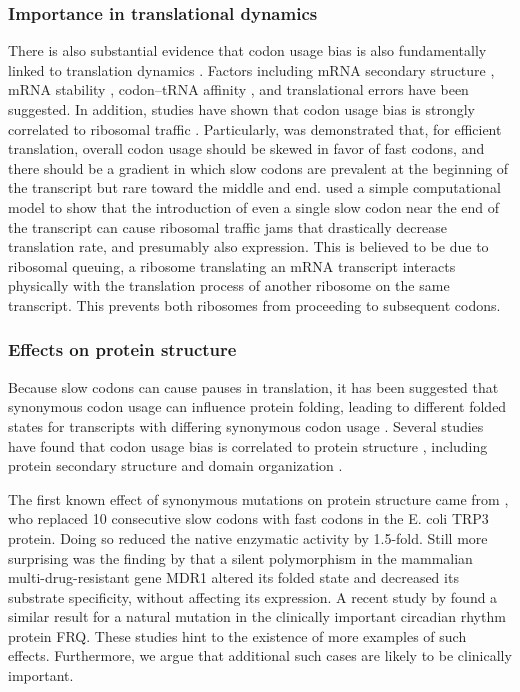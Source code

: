 \documentclass[11pt]{nih}
\begin{document}
\subsubsection{Importance in translational dynamics}
There is also substantial evidence that codon usage bias is also fundamentally linked to translation dynamics  \citep{Bentele2013,Mitarai2013,Cannarozzi2010,Fredrick2010,Marin2008,Buchan2007}. Factors including mRNA secondary structure \citep{Stoletzki2008,Chamary2005,Baim1985}, mRNA stability \citep{Gu2010}, codon--tRNA affinity \cite{Klumpp2012}, and translational errors \cite{Zhou2009,Drummond2008,Najafabadi2007} have been suggested. In addition, studies have shown that codon usage bias is strongly correlated to ribosomal traffic \citep{Cannarozzi2010a,Buchan2007,Komar1999}.  Particularly, was demonstrated that, for efficient translation, overall codon usage should be skewed in favor of fast codons, and there should be a gradient in which slow codons are prevalent at the beginning of the transcript but rare toward the middle and end. \citet{Mitarai2013} used a simple computational model to show that the introduction of even a single slow codon near the end of the transcript can cause ribosomal traffic jams that drastically decrease translation rate, and presumably also expression. This is believed to be due to ribosomal queuing, a ribosome translating an mRNA transcript interacts physically with the translation process of another ribosome on the same transcript. This prevents both ribosomes from proceeding to subsequent codons.

\subsubsection{Effects on protein structure}
Because slow codons can cause pauses in translation, it has been suggested that synonymous codon usage can influence protein folding, leading to different folded states for transcripts with differing synonymous codon usage \cite{Komar2009,Zhang2009,Buchan2007,Crombie1994}.
Several studies have found that codon usage bias is correlated to protein structure \citep{Saunders2010,Biro2006,Adzhubei1996,Gu2003}, including protein secondary structure \citep{Saunders2010,Oresic2003,Gu2003,Thanaraj1996a} and domain organization \citep{Gu2004,Oresic2003}.

The first known effect of synonymous mutations on protein structure came from \citet{Crombie1994}, who replaced 10 consecutive slow codons with fast codons in the E. coli TRP3 protein. Doing so reduced the native enzymatic activity by 1.5-fold. Still more surprising was the finding by \citet{Sarfaty2007} that a silent polymorphism in the mammalian multi-drug-resistant gene MDR1 altered its folded state and decreased its substrate specificity, without affecting its expression. A recent study by \citet{Zhou2013} found a similar result for a natural mutation in the clinically important circadian rhythm protein FRQ. These studies hint to the existence of more examples of such effects. Furthermore, we argue that additional such cases are likely to be clinically important. 
\end{document}
